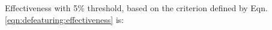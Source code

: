 


Effectiveness with 5\% threshold, based on the criterion defined by Eqn. \ref{eqn:defeaturing:effectiveness} is:

